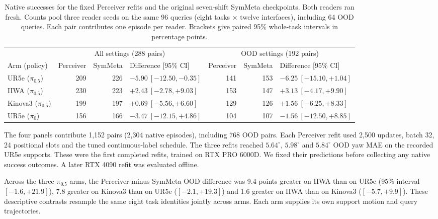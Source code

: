 \documentclass{article}
\theoremstyle{plain}
\theoremstyle{remark}
\begin{document}
\begin{table}[!ht]
  \centering\small
  \caption{Native successes for the fixed Perceiver refits and the original seven-shift SymMeta checkpoints. Both readers ran fresh. Counts pool three reader seeds on the same 96 queries (eight tasks $\times$ twelve interfaces), including 64 OOD queries. Each pair contributes one episode per reader. Brackets give paired 95\% whole-task intervals in percentage points.}
  \label{tab:fresh-retry}
  \setlength{\tabcolsep}{4pt}
  \begin{tabular}{lrrlrrl}
    \toprule
    & \multicolumn{3}{c}{All settings (288 pairs)} & \multicolumn{3}{c}{OOD settings (192 pairs)} \\
    \cmidrule(lr){2-4}\cmidrule(lr){5-7}
    Arm (policy) & Perceiver & SymMeta & Difference [95\% CI] & Perceiver & SymMeta & Difference [95\% CI] \\
    \midrule
    UR5e ($\pi_{0.5}$) & 209 & 226 & $-5.90\ [-12.50,-0.35]$ & 141 & 153 & $-6.25\ [-15.10,+1.04]$ \\
    IIWA ($\pi_{0.5}$) & 230 & 223 & $+2.43\ [-2.78,+9.03]$ & 153 & 147 & $+3.13\ [-4.17,+9.90]$ \\
    Kinova3 ($\pi_{0.5}$) & 199 & 197 & $+0.69\ [-5.56,+6.60]$ & 129 & 126 & $+1.56\ [-6.25,+8.33]$ \\
    UR5e ($\pi_0$) & 156 & 166 & $-3.47\ [-12.15,+4.86]$ & 104 & 107 & $-1.56\ [-12.50,+8.85]$ \\
    \bottomrule
  \end{tabular}
\end{table}

The four panels contribute 1,152 pairs (2,304 native episodes), including 768 OOD pairs. Each Perceiver refit used 2,500 updates, batch 32, 24 positional slots and the tuned continuous-label schedule. The three refits reached $5.64^\circ$, $5.98^\circ$ and $5.84^\circ$ OOD yaw MAE on the recorded UR5e supports. These were the first completed refits, trained on RTX PRO 6000D. We fixed their predictions before collecting any native success outcomes. A later RTX 4090 refit was evaluated offline.

Across the three $\pi_{0.5}$ arms, the Perceiver-minus-SymMeta OOD difference was 9.4 points greater on IIWA than on UR5e (95\% interval $[-1.6,+21.9]$), 7.8 greater on Kinova3 than on UR5e ($[-2.1,+19.3]$) and 1.6 greater on IIWA than on Kinova3 ($[-5.7,+9.9]$). These descriptive contrasts resample the same eight task identities jointly across arms. Each arm supplies its own support motion and query trajectories.
\end{document}
